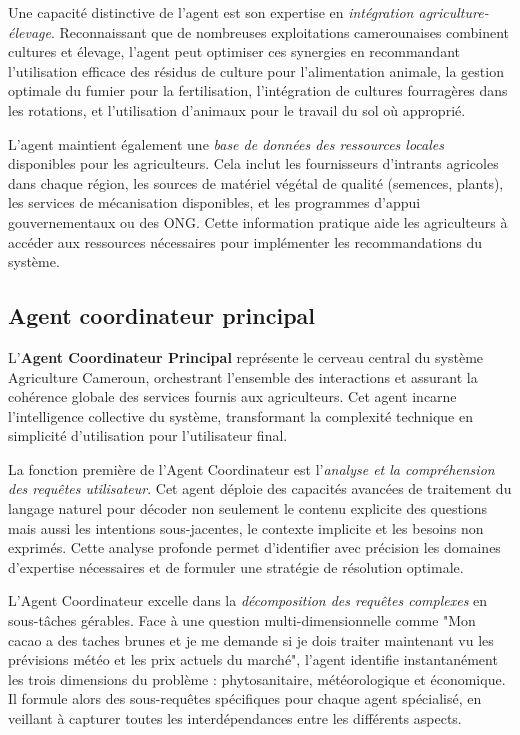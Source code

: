 Une capacité distinctive de l'agent est son expertise en \emph{intégration agriculture-élevage}. Reconnaissant que de nombreuses exploitations camerounaises combinent cultures et élevage, l'agent peut optimiser ces synergies en recommandant l'utilisation efficace des résidus de culture pour l'alimentation animale, la gestion optimale du fumier pour la fertilisation, l'intégration de cultures fourragères dans les rotations, et l'utilisation d'animaux pour le travail du sol où approprié.

L'agent maintient également une \emph{base de données des ressources locales} disponibles pour les agriculteurs. Cela inclut les fournisseurs d'intrants agricoles dans chaque région, les sources de matériel végétal de qualité (semences, plants), les services de mécanisation disponibles, et les programmes d'appui gouvernementaux ou des ONG. Cette information pratique aide les agriculteurs à accéder aux ressources nécessaires pour implémenter les recommandations du système.

\subsection{Agent coordinateur principal}

L'\textbf{Agent Coordinateur Principal} représente le cerveau central du système Agriculture Cameroun, orchestrant l'ensemble des interactions et assurant la cohérence globale des services fournis aux agriculteurs. Cet agent incarne l'intelligence collective du système, transformant la complexité technique en simplicité d'utilisation pour l'utilisateur final.

La fonction première de l'Agent Coordinateur est l'\emph{analyse et la compréhension des requêtes utilisateur}. Cet agent déploie des capacités avancées de traitement du langage naturel pour décoder non seulement le contenu explicite des questions mais aussi les intentions sous-jacentes, le contexte implicite et les besoins non exprimés. Cette analyse profonde permet d'identifier avec précision les domaines d'expertise nécessaires et de formuler une stratégie de résolution optimale.

L'Agent Coordinateur excelle dans la \emph{décomposition des requêtes complexes} en sous-tâches gérables. Face à une question multi-dimensionnelle comme "Mon cacao a des taches brunes et je me demande si je dois traiter maintenant vu les prévisions météo et les prix actuels du marché", l'agent identifie instantanément les trois dimensions du problème : phytosanitaire, météorologique et économique. Il formule alors des sous-requêtes spécifiques pour chaque agent spécialisé, en veillant à capturer toutes les interdépendances entre les différents aspects.

